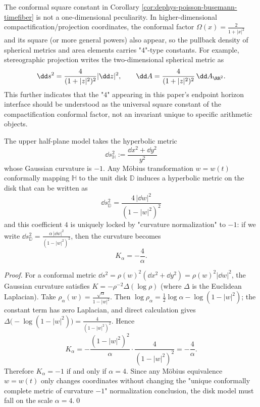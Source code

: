 \begin{remark}\label{rem:dephys-conformal-factor-2square-area-law}
The conformal square constant in Corollary \ref{cor:dephys-poisson-busemann-timefiber} is not a one-dimensional peculiarity.
In higher-dimensional compactification/projection coordinates, the conformal factor \(\Omega(x)=\frac{2}{1+|x|^2}\) and its square (or more general powers) also appear, so the pullback density of spherical metrics and area elements carries "\(4\)"-type constants.
For example, stereographic projection writes the two-dimensional spherical metric as
\[
\dd s^2=\frac{4}{(1+|z|^2)^2}|\dd z|^2,
\qquad
\dd A=\frac{4}{(1+|z|^2)^2}\,\dd A_{\RR^2}.
\]
This further indicates that the "\(4\)" appearing in this paper's endpoint horizon interface should be understood as the universal square constant of the compactification conformal factor, not an invariant unique to specific arithmetic objects.
\end{remark}

\begin{proposition}\label{prop:dephys-hyperbolic-curvature-normalization-four}
The upper half-plane model takes the hyperbolic metric
\[
\dd s_{\mathbb{H}}^{2}:=\frac{\dd x^{2}+\dd y^{2}}{y^{2}}
\]
whose Gaussian curvature is \(-1\).
Any Möbius transformation \(w=w(t)\) conformally mapping \(\mathbb{H}\) to the unit disk \(\mathbb{D}\) induces a hyperbolic metric on the disk that can be written as
\[
\boxed{\;
\dd s_{\mathbb{D}}^{2}=\frac{4\,|\dd w|^{2}}{(1-|w|^{2})^{2}}\;}
\]
and this coefficient \(4\) is uniquely locked by "curvature normalization" to \(-1\):
if we write
\(
\dd s_{\mathbb{D}}^{2}=\frac{\alpha\,|\dd w|^{2}}{(1-|w|^{2})^{2}}
\),
then the curvature becomes
\[
\boxed{\;K_{\alpha}=-\frac{4}{\alpha}.\;}
\]
\end{proposition}

\begin{proof}
For a conformal metric \(\dd s^{2}=\rho(w)^{2}(\dd x^{2}+\dd y^{2})=\rho(w)^{2}|\dd w|^{2}\), the Gaussian curvature satisfies
\(
K=-\rho^{-2}\Delta(\log\rho)
\)
(where \(\Delta\) is the Euclidean Laplacian).
Take \(\rho_{\alpha}(w)=\frac{\sqrt{\alpha}}{1-|w|^{2}}\). Then
\(
\log\rho_{\alpha}=\frac12\log\alpha-\log(1-|w|^{2})
\); the constant term has zero Laplacian, and direct calculation gives
\(
\Delta\bigl(-\log(1-|w|^{2})\bigr)=\frac{4}{(1-|w|^{2})^{2}}
\).
Hence
\[
K_{\alpha}
=-\frac{(1-|w|^{2})^{2}}{\alpha}\cdot \frac{4}{(1-|w|^{2})^{2}}
=-\frac{4}{\alpha}.
\]
Therefore \(K_{\alpha}=-1\) if and only if \(\alpha=4\).
Since any Möbius equivalence \(w=w(t)\) only changes coordinates without changing the "unique conformally complete metric of curvature \(-1\)" normalization conclusion, the disk model must fall on the scale \(\alpha=4\).\qed
\end{proof}

